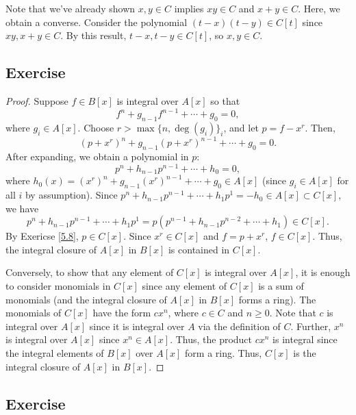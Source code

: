\begin{remark}
Note that we've already shown $x,y \in C$ implies $xy \in C$ and $x + y \in C$. Here, we obtain a converse. Consider the polynomial $(t - x)(t - y) \in C[t]$
since $xy, x+y \in C$. By this result, $t-x,t-y \in C[t]$, so $x,y \in C$.
\end{remark}

\subsection{Exercise}\label{5.9}

\begin{proof}
Suppose $f \in B[x]$ is integral over $A[x]$ so that
$$f^n + g_{n-1} f^{n-1} + \cdots + g_0 = 0,$$
where $g_i \in A[x]$. Choose $r > \max\{n,\deg(g_i)\}_i$, and let $p = f - x^r$. Then,
$$(p + x^r)^n + g_{n-1} (p + x^r)^{n-1} + \cdots + g_0 = 0.$$
After expanding, we obtain a polynomial in $p$:
$$p^n + h_{n-1} p^{n-1} + \cdots + h_0 = 0,$$
where $h_0(x) = (x^r)^n + g_{n-1}(x^r)^{n-1} + \cdots + g_0 \in A[x]$ (since $g_i \in A[x]$ for all $i$ by assumption). Since
$p^n + h_{n-1} p^{n-1} + \cdots + h_1 p^1 = - h_0 \in A[x] \subset C[x]$, we have
$$p^n + h_{n-1} p^{n-1} + \cdots + h_1 p^1 = p(p^{n-1} + h_{n-1} p^{n-2} + \cdots + h_1) \in C[x].$$
By Exericse \ref{5.8}, $p \in C[x]$. Since $x^r \in C[x]$ and $f = p + x^r$, $f \in C[x]$. Thus, the integral closure of $A[x]$ in 
$B[x]$ is contained in $C[x]$.

Conversely, to show that any element of $C[x]$ is integral over $A[x]$, it is enough to consider monomials in $C[x]$ since any element
of $C[x]$ is a sum of monomials (and the integral closure of $A[x]$ in $B[x]$ forms a ring). The monomials of $C[x]$ have the form $c x^n$, 
where $c \in C$ and $n \ge 0$. Note that $c$ is integral over $A[x]$ since it is integral over $A$ via the definition of $C$. Further, $x^n$ 
is integral over $A[x]$ since $x^n \in A[x]$. Thus, the product $cx^n$ is integral since the integral elements of $B[x]$ over $A[x]$ form a 
ring. Thus, $C[x]$ is the integral closure of $A[x]$ in $B[x]$.
\end{proof}

\subsection{Exercise}\label{5.10}

